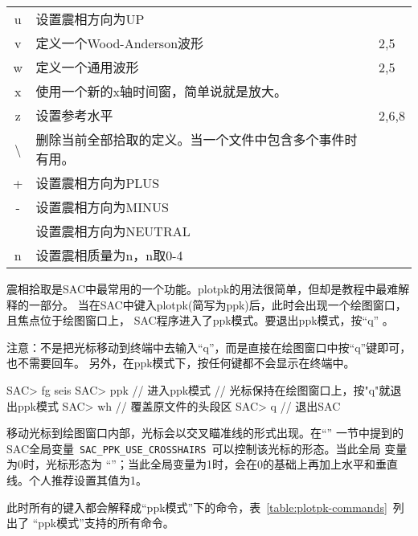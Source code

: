 \begin{table}[H]
\begin{tabular}{cll}
    u	    &	设置震相方向为UP	                    &           \\
    v	    &	定义一个Wood-Anderson波形               &   2,5 	\\
    w	    &	定义一个通用波形                        &   2,5 	\\
    x	    &	使用一个新的x轴时间窗，简单说就是放大。 &           \\
    z	    &	设置参考水平                            &   2,6,8	\\
    \textbackslash	    &	删除当前全部拾取的定义。当一个文件中包含多个事件时有用。&	\\
    +	    &	设置震相方向为PLUS	                    &           \\
    -	    &	设置震相方向为MINUS	                    &           \\
    \lstinline[showspaces]! !   &	设置震相方向为NEUTRAL	                &           \\
    n	    &	设置震相质量为n，n取0-4	                &           \\
	\bottomrule
\end{tabular}
\end{table}

震相拾取是SAC中最常用的一个功能。plotpk的用法很简单，但却是教程中最难解释的一部分。
当在SAC中键入plotpk(简写为ppk)后，此时会出现一个绘图窗口，且焦点位于绘图窗口上，
SAC程序进入了ppk模式。要退出ppk模式，按``q'' 。

注意：不是把光标移动到终端中去输入``q''，而是直接在绘图窗口中按``q''键即可，也不需要回车。
另外，在ppk模式下，按任何键都不会显示在终端中。

\begin{SACCode}
SAC> fg seis
SAC> ppk        // 进入ppk模式
// 光标保持在绘图窗口上，按"q"就退出ppk模式
SAC> wh         // 覆盖原文件的头段区
SAC> q          // 退出SAC
\end{SACCode}


移动光标到绘图窗口内部，光标会以交叉瞄准线的形式出现。在``''
一节中提到的SAC全局变量~\verb+SAC_PPK_USE_CROSSHAIRS+~可以控制该光标的形态。当此全局
变量为0时，光标形态为
``''；当此全局变量为1时，会在0的基础上再加上水平和垂直线。个人推荐设置其值为1。

此时所有的键入都会解释成``ppk模式''下的命令，表~\ref{table:plotpk-commands}~列出了
``ppk模式''支持的所有命令。


